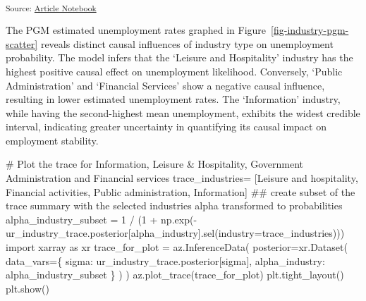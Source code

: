 \documentclass[
]{agujournal2019}
\newenvironment{Shaded}{\begin{snugshade}}{\end{snugshade}}
\newcommand{\CommentTok}[1]{\textcolor[rgb]{0.37,0.37,0.37}{#1}}
\newcommand{\DecValTok}[1]{\textcolor[rgb]{0.68,0.00,0.00}{#1}}
\newcommand{\ImportTok}[1]{\textcolor[rgb]{0.00,0.46,0.62}{#1}}
\newcommand{\NormalTok}[1]{\textcolor[rgb]{0.00,0.23,0.31}{#1}}
\newcommand{\OperatorTok}[1]{\textcolor[rgb]{0.37,0.37,0.37}{#1}}
\newcommand{\StringTok}[1]{\textcolor[rgb]{0.13,0.47,0.30}{#1}}
\begin{document}
\textsubscript{Source:
\href{https://mw1296.github.io/dsan5650_social_causal_inference/index.qmd.html}{Article
Notebook}}

The PGM estimated unemployment rates graphed in
Figure~\ref{fig-industry-pgm-scatter} reveals distinct causal influences
of industry type on unemployment probability. The model infers that the
`Leisure and Hospitality' industry has the highest positive causal
effect on unemployment likelihood. Conversely, `Public Administration'
and `Financial Services' show a negative causal influence, resulting in
lower estimated unemployment rates. The `Information' industry, while
having the second-highest mean unemployment, exhibits the widest
credible interval, indicating greater uncertainty in quantifying its
causal impact on employment stability.

\begin{Shaded}
\begin{Highlighting}[]
\CommentTok{\# Plot the trace for Information, Leisure \& Hospitality, Government Administration and Financial services}
\NormalTok{trace\_industries}\OperatorTok{=}\NormalTok{ [}\StringTok{\textquotesingle{}Leisure and hospitality\textquotesingle{}}\NormalTok{,}
              \StringTok{\textquotesingle{}Financial activities\textquotesingle{}}\NormalTok{,}
              \StringTok{\textquotesingle{}Public administration\textquotesingle{}}\NormalTok{,}
              \StringTok{\textquotesingle{}Information\textquotesingle{}}\NormalTok{]}
\CommentTok{\#\# create subset of the trace summary with the selected industries alpha transformed to probabilities}
\NormalTok{alpha\_industry\_subset }\OperatorTok{=} \DecValTok{1} \OperatorTok{/}\NormalTok{ (}\DecValTok{1} \OperatorTok{+}\NormalTok{ np.exp(}\OperatorTok{{-}}\NormalTok{ur\_industry\_trace.posterior[}\StringTok{\textquotesingle{}alpha\_industry\textquotesingle{}}\NormalTok{].sel(industry}\OperatorTok{=}\NormalTok{trace\_industries)))}
\ImportTok{import}\NormalTok{ xarray }\ImportTok{as}\NormalTok{ xr}
\NormalTok{trace\_for\_plot }\OperatorTok{=}\NormalTok{ az.InferenceData(}
\NormalTok{    posterior}\OperatorTok{=}\NormalTok{xr.Dataset(}
\NormalTok{        data\_vars}\OperatorTok{=}\NormalTok{\{}
            \StringTok{\textquotesingle{}sigma\textquotesingle{}}\NormalTok{: ur\_industry\_trace.posterior[}\StringTok{\textquotesingle{}sigma\textquotesingle{}}\NormalTok{],}
            \StringTok{\textquotesingle{}alpha\_industry\textquotesingle{}}\NormalTok{: alpha\_industry\_subset}
\NormalTok{        \}}
\NormalTok{    )}
\NormalTok{)}
\NormalTok{az.plot\_trace(trace\_for\_plot)}
\NormalTok{plt.tight\_layout()}
\NormalTok{plt.show()}
\end{Highlighting}
\end{Shaded}
\end{document}
